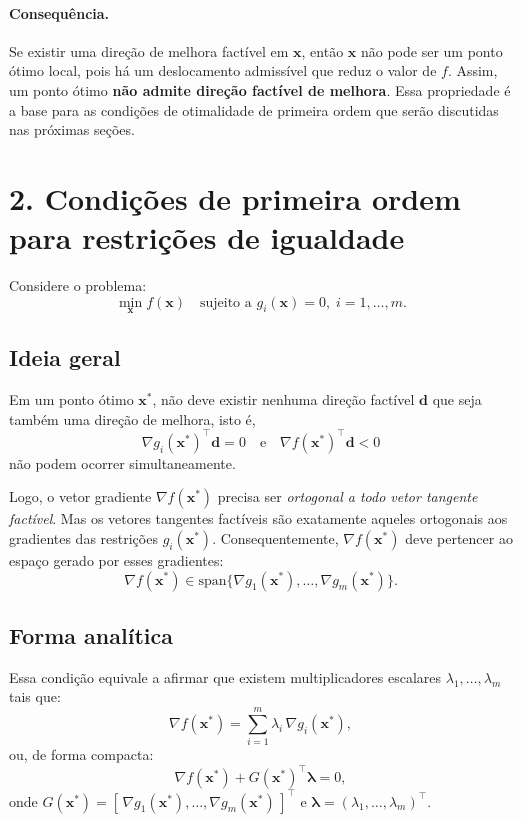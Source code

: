 \documentclass[9pt,a4paper]{extarticle}
\begin{document}
\paragraph{Consequência.}
Se existir uma direção de melhora factível em $\bm{x}$, então $\bm{x}$ não pode ser um ponto ótimo local, pois há um deslocamento admissível que reduz o valor de $f$.  
Assim, um ponto ótimo \textbf{não admite direção factível de melhora}.  
Essa propriedade é a base para as condições de otimalidade de primeira ordem que serão discutidas nas próximas seções.


\section*{2. Condições de primeira ordem para restrições de igualdade}

Considere o problema:
\[
\min_{\bm{x}} f(\bm{x}) \quad \text{sujeito a } g_i(\bm{x}) = 0, \; i=1,\dots,m.
\]

\subsection*{Ideia geral}

Em um ponto ótimo $\bm{x}^*$, não deve existir nenhuma direção factível $\bm{d}$ que seja também uma direção de melhora, isto é,
\[
\nabla g_i(\bm{x}^*)^\top \bm{d} = 0 \quad \text{e} \quad \nabla f(\bm{x}^*)^\top \bm{d} < 0
\]
não podem ocorrer simultaneamente.

Logo, o vetor gradiente $\nabla f(\bm{x}^*)$ precisa ser \textit{ortogonal a todo vetor tangente factível}.  
Mas os vetores tangentes factíveis são exatamente aqueles ortogonais aos gradientes das restrições $g_i(\bm{x}^*)$.  
Consequentemente, $\nabla f(\bm{x}^*)$ deve pertencer ao espaço gerado por esses gradientes:
\[
\nabla f(\bm{x}^*) \in \text{span}\{\nabla g_1(\bm{x}^*), \dots, \nabla g_m(\bm{x}^*)\}.
\]

\subsection*{Forma analítica}

Essa condição equivale a afirmar que existem multiplicadores escalares $\lambda_1, \dots, \lambda_m$ tais que:
\[
\nabla f(\bm{x}^*) = \sum_{i=1}^{m} \lambda_i \, \nabla g_i(\bm{x}^*),
\]
ou, de forma compacta:
\[
\nabla f(\bm{x}^*) + G(\bm{x}^*)^\top \bm{\lambda} = 0,
\]
onde $G(\bm{x}^*) = [\,\nabla g_1(\bm{x}^*), \dots, \nabla g_m(\bm{x}^*)\,]^\top$ e $\bm{\lambda} = (\lambda_1,\dots,\lambda_m)^\top$.
\end{document}

